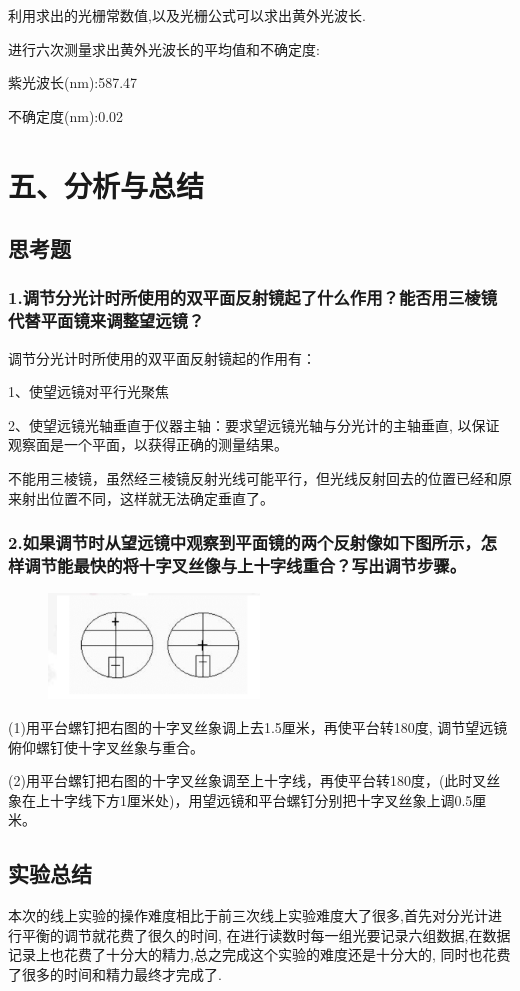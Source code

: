 \documentclass{article}
\begin{document}
    利用求出的光栅常数值,以及光栅公式可以求出黄外光波长.

    进行六次测量求出黄外光波长的平均值和不确定度:
    
    紫光波长(nm):587.47
    
    不确定度(nm):0.02

     


\section*{五、分析与总结}

\subsection*{思考题}
\subsubsection*{1.调节分光计时所使用的双平面反射镜起了什么作用？能否用三棱镜
代替平面镜来调整望远镜？}

调节分光计时所使用的双平面反射镜起的作用有：

1、使望远镜对平行光聚焦

2、使望远镜光轴垂直于仪器主轴：要求望远镜光轴与分光计的主轴垂直, 以保证观察面是一个平面，以获得正确的测量结果。

不能用三棱镜，虽然经三棱镜反射光线可能平行，但光线反射回去的位置已经和原来射出位置不同，这样就无法确定垂直了。 

\subsubsection*{2.如果调节时从望远镜中观察到平面镜的两个反射像如下图所示，怎
样调节能最快的将十字叉丝像与上十字线重合？写出调节步骤。}
\begin{figure}[H]
    \centering
    \includegraphics[width=0.5\textwidth]{25.png}
    \end{figure}


    (1)用平台螺钉把右图的十字叉丝象调上去1.5厘米，再使平台转180度, 调节望远镜俯仰螺钉使十字叉丝象与重合。
    
    (2)用平台螺钉把右图的十字叉丝象调至上十字线，再使平台转180度，(此时叉丝象在上十字线下方1厘米处)，用望远镜和平台螺钉分别把十字叉丝象上调0.5厘米。

    \subsection*{实验总结}
本次的线上实验的操作难度相比于前三次线上实验难度大了很多,首先对分光计进行平衡的调节就花费了很久的时间,
在进行读数时每一组光要记录六组数据,在数据记录上也花费了十分大的精力,总之完成这个实验的难度还是十分大的,
同时也花费了很多的时间和精力最终才完成了.
\end{document}
